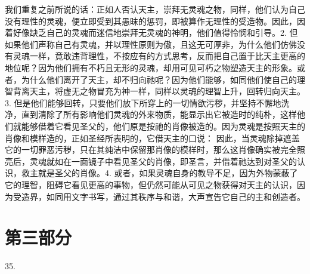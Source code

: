 我们重复之前所说的话：正如人否认天主，崇拜无灵魂之物，同样，他们认为自己没有理性的灵魂，便立即受到其愚昧的惩罚，即被算作无理性的受造物。因此，因着好像缺乏自己的灵魂而迷信地崇拜无灵魂的神明，他们值得怜悯和引导。2. 但如果他们声称自己有灵魂，并以理性原则为傲，且这无可厚非，为什么他们仿佛没有灵魂一样，竟敢违背理性，不按应有的方式思考，反而把自己置于比天主更高的地位呢？因为他们拥有不朽且无形的灵魂，却用可见可朽之物塑造天主的形象。或者，为什么他们离开了天主，却不归向祂呢？因为他们能够，如同他们使自己的理智背离天主，将虚无之物冒充为神一样，同样以灵魂的理智上升，回转归向天主。3. 但是他们能够回转，只要他们放下所穿上的一切情欲污秽，并坚持不懈地洗净，直到清除了所有影响他们灵魂的外来物质，能显示出它被造时的纯朴，这样他们就能够借着它看见圣父的，他们原是按祂的肖像被造的。因为灵魂是按照天主的肖像和模样造的，正如圣经所表明的，它借天主的口说： 因此，当灵魂除掉遮盖它的一切罪恶污秽，只在其纯洁中保留那肖像的模样时，那么这肖像确实被完全照亮后，灵魂就如在一面镜子中看见圣父的肖像，即圣言，并借着祂达到对圣父的认识，救主就是圣父的肖像。4. 或者，如果灵魂自身的教导不足，因为外物蒙蔽了它的理智，阻碍它看见更高的事物，但仍然可能从可见之物获得对天主的认识，因为受造界，如同用文字书写，通过其秩序与和谐，大声宣告它自己的主和创造者。\par


\section{第三部分}

35. \par

